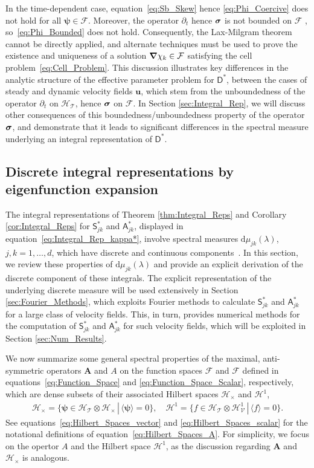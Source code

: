 \documentclass[leqno,onefignum,onetabnum]{siamltex1213}
\renewcommand{\d}{\mathrm{d}}
\newcommand{\Ab}{\mathbf{A}}
\newcommand{\Tc}{\mathcal{T}}
\newcommand{\Vc}{\mathcal{V}}
\newcommand{\Hc}{\mathcal{H}}
\newcommand{\Fc}{\mathcal{F}}
\newcommand{\Dm}{\mathsf{D}}
\newcommand{\Sm}{\mathsf{S}}
\newcommand{\Am}{\mathsf{A}}
\newcommand{\Hs}{\mathscr{H}}
\newcommand{\Fs}{\mathscr{F}}
\newcommand\bsig{\mbox{\boldmath${\sigma}$}}
\newcommand\bnabla{\mbox{\boldmath${\nabla}$}}
\newcommand{\vecu}{\boldsymbol{u}}
\newcommand{\vecpsi}{\boldsymbol{\psi}}
\begin{document}
In the time-dependent case, equation~\eqref{eq:Sb_Skew} hence
\eqref{eq:Phi_Coercive} does not hold for all $\vecpsi\in\Fc$. Moreover, 
the operator $\partial_t$ hence $\bsig$ is not bounded on $\Fc$
\cite{Reed-1980,Stakgold:BVP:2000}, so~\eqref{eq:Phi_Bounded} does not
hold. Consequently, the Lax-Milgram theorem cannot be directly
applied, and alternate techniques  
\cite{Friedman:1969:PDE,Friedman:1969:PDE:Parabolic} must be used to
prove the existence and uniqueness of a solution $\bnabla \chi_k\in\Fc$ 
satisfying the cell problem~\eqref{eq:Cell_Problem}. This discussion
illustrates key differences in the analytic structure of the effective
parameter problem for $\Dm^*$, between the cases of steady and
dynamic velocity fields $\vecu $, which stem from the unboundedness
of the operator $\partial_t$ on $\Hc_{\Tc}$, hence $\bsig$ on $\Fc$. In Section
\ref{sec:Integral_Rep}, we will discuss other consequences of this
boundedness/unboundedness property of the operator $\bsig$, and
demonstrate that it leads to significant differences in the spectral
measure underlying an  integral representation of $\Dm^*$.     


\subsection{Discrete integral representations by eigenfunction
  expansion}\label{sec:Eig_Funct_Exp} 
%
The integral representations of Theorem \ref{thm:Integral_Reps} and
Corollary \ref{cor:Integral_Reps} for $\Sm^*_{jk}$ and $\Am^*_{jk}$,
displayed in equation~\eqref{eq:Integral_Rep_kappa*},  involve
spectral measures $\d\mu_{jk}(\lambda)$, $j,k=1,\ldots,d$, which have discrete and
continuous components~\cite{Reed-1980,Stone:64}. In this section, we
review these properties of $\d\mu_{jk}(\lambda)$ and provide an explicit
derivation of the discrete component of these integrals. The 
explicit representation of the underlying discrete measure will
be used extensively in Section \ref{sec:Fourier_Methods}, which
exploits Fourier methods to calculate $\Sm^*_{jk}$ and $\Am^*_{jk}$ for a
large class of velocity fields. This, in turn, provides numerical
methods for the computation of $\Sm^*_{jk}$ and $\Am^*_{jk}$ for such
velocity fields, which will be exploited in Section
\ref{sec:Num_Results}.   



We now summarize some general spectral properties of the maximal,
anti-symmetric operators $\Ab$ and $A$ on the function spaces $\Fc$
and $\Fs$ defined in equations~\eqref{eq:Function_Space} and
\eqref{eq:Function_Space_Scalar}, respectively, which are dense
subsets of their associated Hilbert spaces $\Hc_\times$ and $\Hs^1$,  
%
\begin{align}\label{eq:Hilbert_Spaces_A}
  \Hc_\times=\{\vecpsi\in \Hc_\Tc\otimes\Hc_\times \,|\, \langle\vecpsi\rangle=0\},\quad
  \Hs^1=\{f\in \Hs_\Tc\otimes\Hs^1_\Vc \,|\, \langle f\rangle=0\}.
\end{align}
%
See equations~\eqref{eq:Hilbert_Spaces_vector} and
\eqref{eq:Hilbert_Spaces_scalar} for the notational definitions of
equation~\eqref{eq:Hilbert_Spaces_A}. For simplicity, we focus on the 
opertor $A$ and the Hilbert space $\Hs^1$, as the discussion regarding
$\Ab$ and $\Hc_\times$ is analogous.
\end{document}
